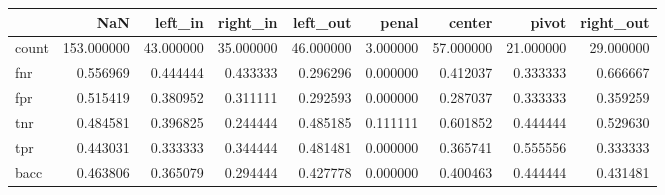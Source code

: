 \begin{tabular}{lrrrrrrrr}
\toprule
{} &         NaN &    left\_in &   right\_in &   left\_out &     penal &     center &      pivot &  right\_out \\
\midrule
count &  153.000000 &  43.000000 &  35.000000 &  46.000000 &  3.000000 &  57.000000 &  21.000000 &  29.000000 \\
fnr   &    0.556969 &   0.444444 &   0.433333 &   0.296296 &  0.000000 &   0.412037 &   0.333333 &   0.666667 \\
fpr   &    0.515419 &   0.380952 &   0.311111 &   0.292593 &  0.000000 &   0.287037 &   0.333333 &   0.359259 \\
tnr   &    0.484581 &   0.396825 &   0.244444 &   0.485185 &  0.111111 &   0.601852 &   0.444444 &   0.529630 \\
tpr   &    0.443031 &   0.333333 &   0.344444 &   0.481481 &  0.000000 &   0.365741 &   0.555556 &   0.333333 \\
bacc  &    0.463806 &   0.365079 &   0.294444 &   0.427778 &  0.000000 &   0.400463 &   0.444444 &   0.431481 \\
\bottomrule
\end{tabular}
